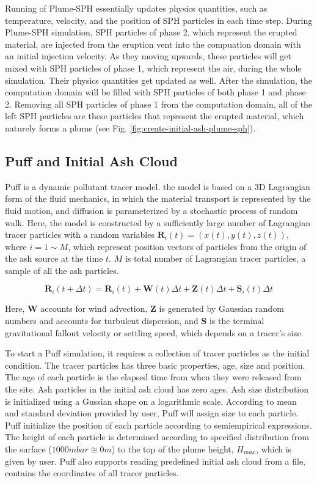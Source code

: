 \documentclass[utf8]{frontiersSCNS} %
\begin{document}
Running of Plume-SPH essentially updates physics quantities, such as temperature, velocity, and the position of SPH particles in each time step. During Plume-SPH simulation, SPH particles of phase 2, which represent the erupted material, are injected from the eruption vent into the compuation domain with an initial injection velocity. As they moving upwards, these particles will get mixed with SPH particles of phase 1, which represent the air, during the whole simulation. Their physics quantities get updated as well. After the simulation, the computation domain will be filled with SPH particles of both phase 1 and phase 2. Removing all SPH particles of phase 1 from the computation domain, all of the left SPH particles are these particles that represent the erupted material, which naturely forms a plume (see  Fig. \ref{fig:create-initial-ash-plume-sph}). 

\subsection{Puff and Initial Ash Cloud} \label{sec:puff-model}
 Puff \citep{tanaka1991development,searcy1998puff} is a dynamic pollutant tracer model. the model is based on a 3D Lagrangian form of the fluid mechanics, in which the material transport is represented by the fluid motion, and diffusion is parameterized by a stochastic process of random walk. Here, the model is constructed by a sufficiently large number of  Lagrangian tracer particles with a random variables $\textbf{R}_i(t) = (x(t),y(t),z(t))$, where $ i = 1 \sim M$, which represent position vectors of particles from the origin of the ash source at the time $t$. $M$ is total number of  Lagrangian tracer particles,  a sample of all the ash particles.
\begin{linenomath*}
\begin{equation}
\textbf{R}_i(t+\Delta t) = \textbf{R}_i(t) + \textbf{W}(t)\Delta t + \textbf{Z}(t)\Delta t + \textbf{S}_i(t) \Delta t
\end{equation}
\end{linenomath*}
Here, $\textbf{W}$ accounts for wind advection, $\textbf{Z}$  is generated by Gaussian random numbers and accounts for turbulent dispersion, and $\textbf{S}$ is the terminal gravitational fallout velocity or settling speed, which depends on a tracer's size.

To start a Puff simulation, it requires a collection of tracer particles as the initial condition. The tracer particles has three basic properties, age, size and position. The age of each particle is the elapsed time from when they were released from the site. Ash particles in the initial ash cloud has zero ages. Ash size distribution is initialized using a Gussian shape on a logarithmic scale. According to mean and standard deviation provided by user, Puff will assign size to each particle. Puff initialize the position of each particle according to semiempirical expressions. The height of each particle is determined according to specified distribution from the surface ($1000 mbar \cong 0 m$) to the top of the plume height, $H_{max}$, which is given by user. Puff also supports reading predefined initial ash cloud from a file, contains the coordinates of all tracer particles.
\end{document}
